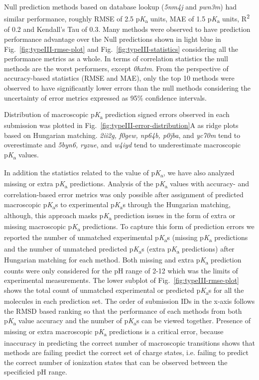 \documentclass[9pt,lineno,final]{elife}
\newcommand{\pKa}{p\textit{K}\textsubscript{a}}
\begin{document}
Null prediction methods based on database lookup (\textit{5nm4j} and \textit{pwn3m}) had similar performance, roughly RMSE of 2.5 \pKa{} units, MAE of 1.5 \pKa{} units, R\textsuperscript{2} of 0.2 and Kendall's Tau of 0.3.
Many methods were observed to have prediction performance advantage over the Null predictions shown in light blue in Fig.~\ref{fig:typeIII-rmse-plot} and Fig.~\ref{fig:typeIII-statistics} considering all the performance metrics as a whole.
In terms of correlation statistics the null methods are the worst performers, except \textit{0hxtm}.
From the perspective of accuracy-based statistics (RMSE and MAE), only the top 10 methods were observed to have significantly lower errors than the null methods considering the uncertainty of error metrics expressed as 95\% confidence intervals.

Distribution of macroscopic \pKa{} prediction signed errors observed in each submission was plotted in Fig.~\ref{fig:typeIII-error-distribution}A as ridge plots based on Hungarian matching.
\textit{2ii2g, f0gew, np64b, p0jba}, and \textit{yc70m} tend to overestimate and \textit{
5byn6, ryzue}, and \textit{w4iyd} tend to underestimate macroscopic \pKa{} values. 

In addition the statistics related to the value of \pKa{}, we have also analyzed missing or extra \pKa{} predictions. 
Analysis of the \pKa{} values with accuracy- and correlation-based error metrics was only possible after assignment of predicted macroscopic \pKa{}s to experimental \pKa{}s through the Hungarian matching, although, this approach masks \pKa{} prediction issues in the form of extra or missing macroscopic \pKa{} predictions. 
To capture this form of prediction errors we reported the number of unmatched experimental \pKa{}s (missing \pKa{} predictions and the number of unmatched predicted \pKa{}s (extra \pKa{} predictions) after Hungarian matching for each method. 
Both missing and extra \pKa{} prediction counts were only considered for the pH range of 2-12 which was the limits of experimental measurements.
The lower subplot of Fig.~\ref{fig:typeIII-rmse-plot} shows the total count of unmatched experimental or predicted \pKa{}s for all the molecules in each prediction set. The order of submission IDs in the x-axis follows the RMSD based ranking so that the performance of each methods from both \pKa{} value accuracy and the number of \pKa{}s can be viewed together.
Presence of missing or extra macroscopic \pKa{} predictions is a critical error, because inaccuracy in predicting the correct number of macroscopic transitions shows that methods are failing predict the correct set of charge states, i.e. failing to predict the correct number of ionization states that can be observed between the specificied pH range. 
\end{document}
